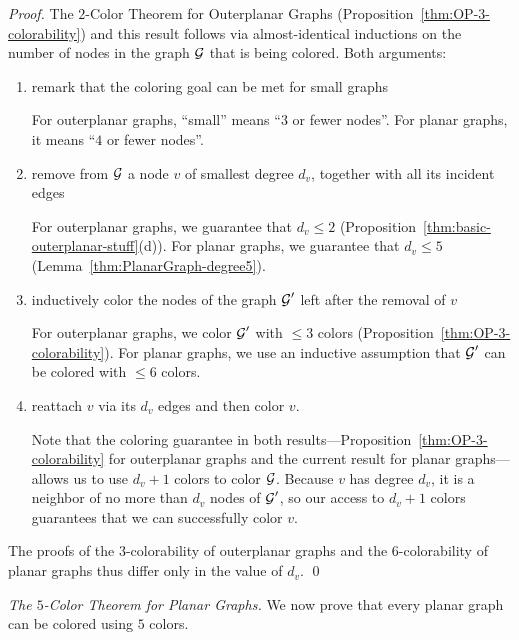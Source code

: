 \begin{proof}
The $2$-Color Theorem for Outerplanar Graphs
(Proposition~\ref{thm:OP-3-colorability}) and this result follows via
almost-identical inductions on the number of nodes in the graph $\mbox{$\cal G$}$
that is being colored.  Both arguments:
\begin{enumerate}
\item
remark that the coloring goal can be met for small graphs

For outerplanar graphs, ``small'' means ``$3$ or fewer nodes''.  For
planar graphs, it means ``$4$ or fewer nodes''.

\item
remove from $\mbox{$\cal G$}$ a node $v$ of smallest degree $d_v$, together with
all its incident edges

For outerplanar graphs, we guarantee that $d_v \leq 2$
(Proposition~\ref{thm:basic-outerplanar-stuff}(d)).  For planar
graphs, we guarantee that $d_v \leq 5$
(Lemma~\ref{thm:PlanarGraph-degree5}).

\item
inductively color the nodes of the graph $\mbox{$\cal G$}'$ left after the removal
of $v$

For outerplanar graphs, we color $\mbox{$\cal G$}'$ with $\leq 3$ colors
(Proposition~\ref{thm:OP-3-colorability}).  For planar
graphs, we use an inductive assumption that $\mbox{$\cal G$}'$ can be colored with
$\leq 6$ colors. 

\item
reattach $v$ via its $d_v$ edges and then color $v$.

Note that the coloring guarantee in both
results---Proposition~\ref{thm:OP-3-colorability} for outerplanar
graphs and the current result for planar graphs---allows us to use
$d_v +1$ colors to color $\mbox{$\cal G$}$.  Because $v$ has degree $d_v$, it is a
neighbor of no more than $d_v$ nodes of $\mbox{$\cal G$}'$, so our access to $d_v
+1$ colors guarantees that we can successfully color $v$.
\end{enumerate}
The proofs of the $3$-colorability of outerplanar graphs and the
$6$-colorability of planar graphs thus differ only in the value of
$d_v$.  \qed
\end{proof}

\bigskip

{\it The $5$-Color Theorem for Planar Graphs.}
We now prove that every planar graph can be colored using $5$ colors.
\bigskip

\noindent {}
\bigskip

